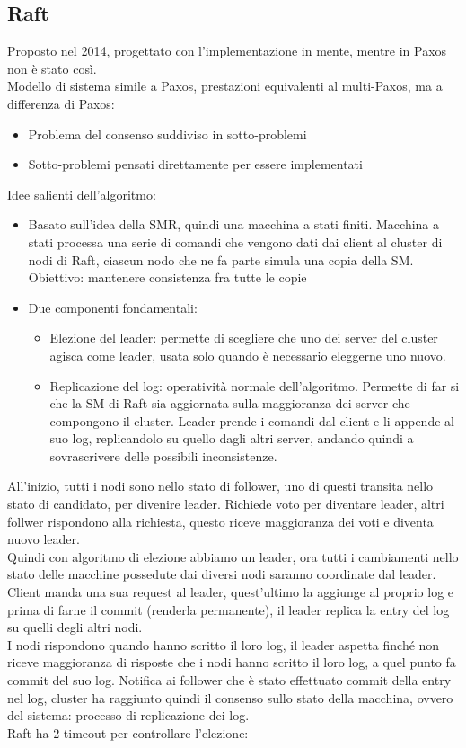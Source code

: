 \documentclass{article}
\begin{document}
\subsection{Raft}
Proposto nel 2014, progettato con l'implementazione in mente, mentre in Paxos non è stato così.\\ Modello di sistema simile a Paxos, prestazioni equivalenti al multi-Paxos, ma a differenza di Paxos:
\begin{itemize}
\item Problema del consenso suddiviso in sotto-problemi
\item Sotto-problemi pensati direttamente per essere implementati
\end{itemize}
Idee salienti dell'algoritmo:
\begin{itemize}
\item Basato sull'idea della SMR, quindi una macchina a stati finiti. Macchina a stati processa una serie di comandi che vengono dati dai client al cluster di nodi di Raft, ciascun nodo che ne fa parte simula una copia della SM. Obiettivo: mantenere consistenza fra tutte le copie
\item Due componenti fondamentali:
\begin{itemize}
\item Elezione del leader: permette di scegliere che uno dei server del cluster agisca come leader, usata solo quando è necessario eleggerne uno nuovo.
\item Replicazione del log: operatività normale dell'algoritmo. Permette di far si che la SM di Raft sia aggiornata sulla maggioranza dei server che compongono il cluster. Leader prende i comandi dal client e li appende al suo log, replicandolo su quello dagli altri server, andando quindi a sovrascrivere delle possibili inconsistenze.
\end{itemize}
\end{itemize}
All'inizio, tutti i nodi sono nello stato di follower, uno di questi transita nello stato di candidato, per divenire leader. Richiede voto per diventare leader, altri follwer rispondono alla richiesta, questo riceve maggioranza dei voti e diventa nuovo leader.\\ Quindi con algoritmo di elezione abbiamo un leader, ora tutti i cambiamenti nello stato delle macchine possedute dai diversi nodi saranno coordinate dal leader.\\ Client manda una sua request al leader, quest'ultimo la aggiunge al proprio log e prima di farne il commit (renderla permanente), il leader replica la entry del log su quelli degli altri nodi.\\ I nodi rispondono quando hanno scritto il loro log, il leader aspetta finché non riceve maggioranza di risposte che i nodi hanno scritto il loro log, a quel punto fa commit del suo log. Notifica ai follower che è stato effettuato commit della entry nel log, cluster ha raggiunto quindi il consenso sullo stato della macchina, ovvero del sistema: processo di replicazione dei log.\\ Raft ha 2 timeout per controllare l'elezione:
\end{document}
